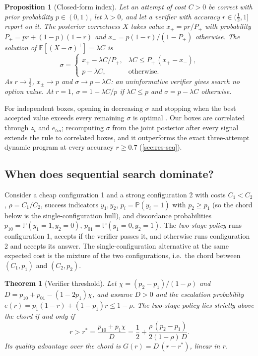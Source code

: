 \documentclass[11pt,a4paper]{article}
\newtheorem{theorem}{Theorem}
\newtheorem{proposition}{Proposition}
\theoremstyle{definition}
\theoremstyle{remark}
\theoremstyle{definition}
\newcommand{\E}{\mathbb{E}}
\renewcommand{\Pr}{\mathbb{P}}
\begin{document}
\begin{proposition}[Closed-form index]
\label{prop:pandora}
Let an attempt of cost $C>0$ be correct with prior probability $p\in(0,1)$, let $\lambda>0$, and let a verifier with accuracy $r\in(\tfrac12,1]$ report on it. The posterior correctness $X$ takes value $x_+=pr/P_+$ with probability $P_+=pr+(1-p)(1-r)$ and $x_-=p(1-r)/(1-P_+)$ otherwise. The solution of $\E[(X-\sigma)^+]=\lambda C$ is
\[
\sigma=\begin{cases} x_+-\lambda C/P_+, & \lambda C\le P_+\,(x_+-x_-),\\ p-\lambda C, & \text{otherwise.}\end{cases}
\]
As $r\to\tfrac12$, $x_\pm\to p$ and $\sigma\to p-\lambda C$: an uninformative verifier gives search no option value. At $r=1$, $\sigma=1-\lambda C/p$ if $\lambda C\le p$ and $\sigma=p-\lambda C$ otherwise.
\end{proposition}
For independent boxes, opening in decreasing $\sigma$ and stopping when the best accepted value exceeds every remaining $\sigma$ is optimal \cite{weitzman1979}. Our boxes are correlated through $z_t$ and $e_{tm}$; recomputing $\sigma$ from the joint posterior after every signal extends the rule to correlated boxes, and it outperforms the exact three-attempt dynamic program at every accuracy $r\ge0.7$ (\cref{sec:res-seq}).

\subsection{When does sequential search dominate?}

Consider a cheap configuration 1 and a strong configuration 2 with costs $C_1<C_2$, $\rho=C_1/C_2$, success indicators $y_1,y_2$, $p_i=\Pr(y_i=1)$ with $p_2\ge p_1$ (so the chord below is the single-configuration hull), and discordance probabilities $p_{10}=\Pr(y_1=1,y_2=0)$, $p_{01}=\Pr(y_1=0,y_2=1)$. The \emph{two-stage policy} runs configuration 1, accepts if the verifier passes it, and otherwise runs configuration 2 and accepts its answer. The single-configuration alternative at the same expected cost is the mixture of the two configurations, i.e.\ the chord between $(C_1,p_1)$ and $(C_2,p_2)$.

\begin{theorem}[Verifier threshold]
\label{thm:rstar}
Let $\chi=(p_2-p_1)/(1-\rho)$ and $D=p_{10}+p_{01}-(1-2p_1)\chi$, and assume $D>0$ and the escalation probability $e(r)=p_1(1-r)+(1-p_1)r\le 1-\rho$. The two-stage policy lies strictly above the chord if and only if
\begin{equation}
r>r^\ast=\frac{p_{10}+p_1 \chi}{D}=\frac12+\frac{\rho\,(p_2-p_1)}{2(1-\rho)\,D}.
\label{eq:rstar}
\end{equation}
Its quality advantage over the chord is $G(r)=D\,(r-r^\ast)$, linear in $r$.
\end{theorem}
\end{document}

